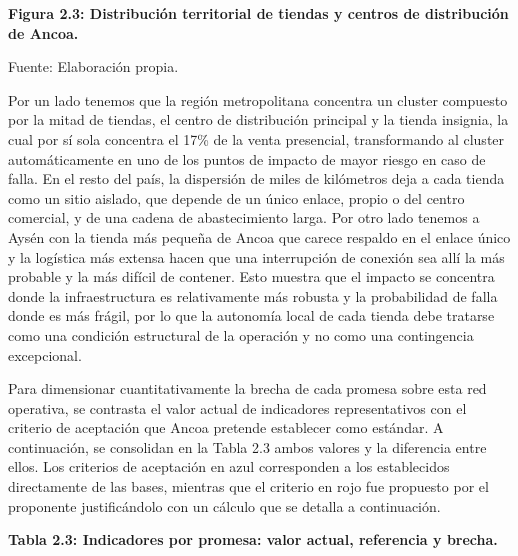 \documentclass[11pt]{article}
\begin{document}
\textbf{Figura 2.3: Distribución territorial de tiendas y centros de distribución de Ancoa.}

Fuente: Elaboración propia.

Por un lado tenemos que la región metropolitana concentra un cluster compuesto por la mitad de tiendas, el centro de distribución principal y la tienda insignia, la cual por sí sola concentra el 17\% de la venta presencial, transformando al cluster automáticamente en uno de los puntos de impacto de mayor riesgo en caso de falla. En el resto del país, la dispersión de miles de kilómetros deja a cada tienda como un sitio aislado, que depende de un único enlace, propio o del centro comercial, y de una cadena de abastecimiento larga. Por otro lado tenemos a Aysén con la tienda más pequeña de Ancoa que carece respaldo en el enlace único y la logística más extensa hacen que una interrupción de conexión sea allí la más probable y la más difícil de contener. Esto muestra que el impacto se concentra donde la infraestructura es relativamente más robusta y la probabilidad de falla donde es más frágil, por lo que la autonomía local de cada tienda debe tratarse como una condición estructural de la operación y no como una contingencia excepcional.

Para dimensionar cuantitativamente la brecha de cada promesa sobre esta red operativa, se contrasta el valor actual de indicadores representativos con el criterio de aceptación que Ancoa pretende establecer como estándar. A continuación, se consolidan en la Tabla 2.3 ambos valores y la diferencia entre ellos. Los criterios de aceptación en azul corresponden a los establecidos directamente de las bases, mientras que el criterio en rojo fue propuesto por el proponente justificándolo con un cálculo que se detalla a continuación.

\textbf{Tabla 2.3: Indicadores por promesa: valor actual, referencia y brecha.}
\end{document}
